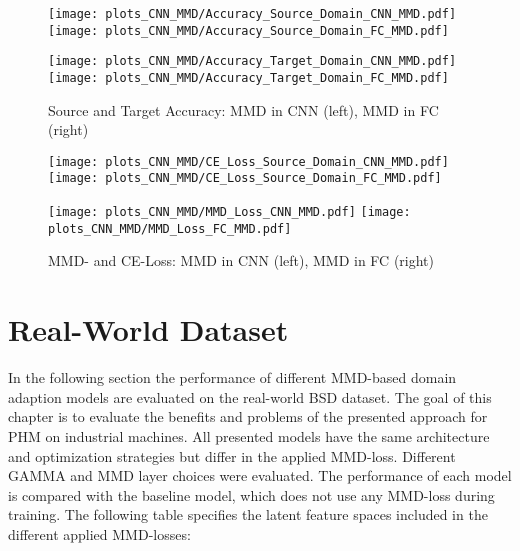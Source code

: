 \begin{figure}[htp]
  \centering
  \texttt{[image: plots\_CNN\_MMD/Accuracy\_Source\_Domain\_CNN\_MMD.pdf]}
  \hspace{.3cm}
  \texttt{[image: plots\_CNN\_MMD/Accuracy\_Source\_Domain\_FC\_MMD.pdf]}

  \vspace{.1cm}

  \texttt{[image: plots\_CNN\_MMD/Accuracy\_Target\_Domain\_CNN\_MMD.pdf]}
  \hspace{.3cm}
  \texttt{[image: plots\_CNN\_MMD/Accuracy\_Target\_Domain\_FC\_MMD.pdf]}

  \caption{Source and Target Accuracy: MMD in CNN (left), MMD in FC (right)}
  \label{fig:accuracy_cnn_and_no_cnn_mmd}
\end{figure}

\begin{figure}[H]
  \centering
  \texttt{[image: plots\_CNN\_MMD/CE\_Loss\_Source\_Domain\_CNN\_MMD.pdf]}
  \hspace{.3cm}
  \texttt{[image: plots\_CNN\_MMD/CE\_Loss\_Source\_Domain\_FC\_MMD.pdf]}

  \vspace{.1cm}

  \texttt{[image: plots\_CNN\_MMD/MMD\_Loss\_CNN\_MMD.pdf]}
  \hspace{.1cm}
  \texttt{[image: plots\_CNN\_MMD/MMD\_Loss\_FC\_MMD.pdf]}

  \caption{MMD- and CE-Loss: MMD in CNN (left), MMD in FC (right)}
  \label{fig:loss_cnn_and_no_cnn_mmd}
\end{figure}

\section{Real-World Dataset}
In the following section the performance of different MMD-based domain adaption models are evaluated on the real-world BSD dataset. The goal of this chapter is to evaluate the benefits and problems of the presented approach for PHM on industrial machines. All presented models have the same architecture and optimization strategies but differ in the applied MMD-loss. Different GAMMA and MMD layer choices were evaluated. The performance of each model is compared with the baseline model, which does not use any MMD-loss during training. The following table specifies the latent feature spaces included in the different applied MMD-losses:

